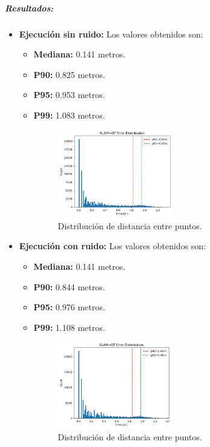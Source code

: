 \documentclass[12pt, a4paper, twoside]{article}
\begin{document}
\subparagraph{Resultados:}
\begin{itemize}
  \item \textbf{Ejecución sin ruido:} Los valores obtenidos son:
  \begin{itemize}
    \item \textbf{Mediana:} 0.141 metros. 
    \item \textbf{P90:} 0.825 metros.
    \item \textbf{P95:} 0.953 metros.
    \item \textbf{P99:} 1.083 metros.
    \begin{figure}[h]
      \centering
        \includegraphics[width=0.5\textwidth]{ed_clean.png}
        \caption{Distribución de distancia entre puntos.}
    \end{figure} 
    \end{itemize}
  \item \textbf{Ejecución con ruido:} Los valores obtenidos son:
  \begin{itemize}
    \item \textbf{Mediana:} 0.141 metros. 
    \item \textbf{P90:} 0.844 metros.
    \item \textbf{P95:} 0.976 metros.
    \item \textbf{P99:} 1.108 metros.
    \begin{figure}[h]
      \centering
        \includegraphics[width=0.5\textwidth]{ed_noisy.png}
      \caption{Distribución de distancia entre puntos.}
    \end{figure} 
  \end{itemize}
\end{itemize}
\end{document}

